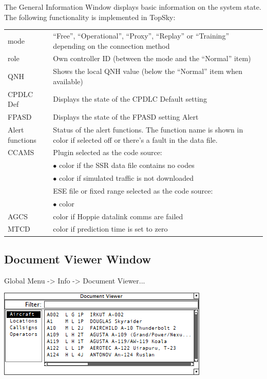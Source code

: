 \documentclass[11pt,a4paper]{memoir}
\newcommand{\colorref}[1]{\textit{\hyperref[#1]{\StrDel{#1}{color:}}}}
\begin{document}
The General Information Window displays basic information on the system state. The following functionality is implemented in TopSky:

\begin{tabular}{l l}
    mode                & “Free”, “Operational”, “Proxy”, “Replay” or “Training” depending on the connection method \\
    role                & Own controller ID (between the mode and the “Normal” item)\\
    QNH                 & Shows the local QNH value (below the “Normal” item when available)\\
    CPDLC Def           & Displays the state of the CPDLC Default setting\\
    FPASD               & Displays the state of the FPASD setting Alert\\
    Alert functions     & Status of the alert functions. The function name is shown in \colorref{color:Warning} color if selected off or there’s a fault in the data file.\\
    CCAMS               & Plugin selected as the code source:\\
                        & $\bullet$ \colorref{color:Urgency} color if the SSR data file contains no codes\\
                        & $\bullet$ \colorref{color:Warning} color if simulated traffic is not downloaded\\
                        & ESE file or fixed range selected as the code source:\\
                        & $\bullet$ \colorref{color:Warning} color\\
    AGCS                & \colorref{color:Warning} color if Hoppie datalink comms are failed\\
    MTCD                & \colorref{color:Warning} color if prediction time is set to zero    \\
\end{tabular}

\subsection{Document Viewer Window}
\label{win:dvw}

Global Menu -> Info -> Document Viewer...

\includegraphics{img/doc.png}
\end{document}
